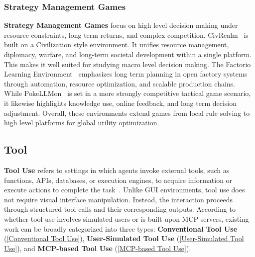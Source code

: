 \subsubsection{Strategy Management Games}
\label{Strategy Management Games}
\textbf{Strategy Management Games} focus on high level decision making under resource constraints, long term returns, and complex competition. CivRealm~\cite{CivRealm} is built on a Civilization style environment. It unifies resource management, diplomacy, warfare, and long-term societal development within a single platform. This makes it well suited for studying macro level decision making. The Factorio Learning Environment~\cite{FactorioLearningEnvironment} emphasizes long term planning in open factory systems through automation, resource optimization, and scalable production chains. 
While PokeLLMon~\cite{PokeLLMon} is set in a more strongly competitive tactical game scenario, it likewise highlights knowledge use, online feedback, and long term decision adjustment. Overall, these environments extend games from local rule solving to high level platforms for global utility optimization.



\subsection{Tool}
\label{Tool}
\textbf{Tool Use} refers to settings in which agents invoke external tools, such as functions, APIs, databases, or execution engines, to acquire information or execute actions to complete the task~\cite{API-Bank,BFCL,ACEBench,ToolBench,tau-bench,UserBench,tau2-bench,MCPVerse,MCPToolBench++,MCP-Bench}. Unlike GUI environments, tool use does not require visual interface manipulation. Instead, the interaction proceeds through structured tool calls and their corresponding outputs. According to whether tool use involves simulated users or is built upon MCP servers, existing work can be broadly categorized into three types: \textbf{Conventional Tool Use} (\cref{Conventional Tool Use}), \textbf{User-Simulated Tool Use} (\cref{User-Simulated Tool Use}), and \textbf{MCP-based Tool Use} (\cref{MCP-based Tool Use}).

